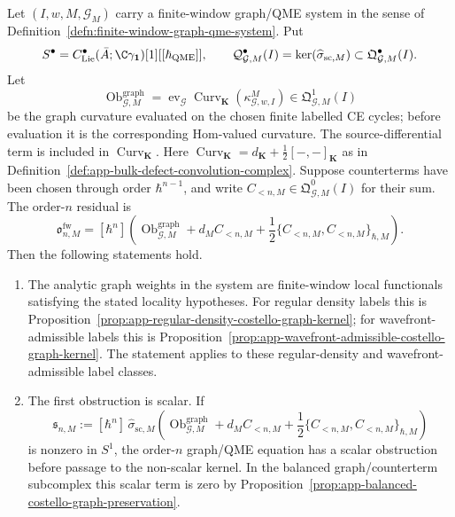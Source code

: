 \begin{thm}\label{thm:finite-window-graph-qme-assembly}
  Let
  \((I,w,M,\mathcal G_M)\) carry a finite-window graph/QME system in the
  sense of Definition~\ref{defn:finite-window-graph-qme-system}.  Put
  \[
    S^\bullet=
    C^\bullet_{\mathrm{Lie}}(\bar A;\C\gamma_{\mathbf 1})[1][[\hbar_{\mathrm{QME}}]],
    \qquad
    \mathcal Q^\bullet_{\mathcal G,M}(I)
      =
    \ker(\widehat\sigma_{\mathrm{sc},M})
      \subset \mathfrak Q^\bullet_{\mathcal G,M}(I).
  \]
  Let
  \[
    \operatorname{Ob}^{\mathrm{graph}}_{\mathcal G,M}
      =
    \operatorname{ev}_{\mathcal G}
    \operatorname{Curv}_{\mathbf K}(\kappa^M_{\mathcal G,w,I})
      \in \mathfrak Q^1_{\mathcal G,M}(I)
  \]
  be the graph curvature evaluated on the chosen finite labelled CE
  cycles; before evaluation it is the corresponding Hom-valued curvature.
  The source-differential term is included in
  \(\operatorname{Curv}_{\mathbf K}\).  Here
  \(\operatorname{Curv}_{\mathbf K}=d_{\mathbf K}
  +\frac12[-,-]_{\mathbf K}\) as in
  Definition~\ref{def:app-bulk-defect-convolution-complex}.  Suppose
  counterterms have been chosen through order \(\hbar^{n-1}\), and write
  \(C_{<n,M}\in\mathfrak Q^0_{\mathcal G,M}(I)\) for their sum.  The
  order-\(n\) residual is
  \[
    \mathfrak o^{\mathrm{fw}}_{n,M}
      =
    [\hbar^n]\left(
      \operatorname{Ob}^{\mathrm{graph}}_{\mathcal G,M}
      +d_M C_{<n,M}
      +\frac12\{C_{<n,M},C_{<n,M}\}_{\hbar,M}
    \right).
  \]
  Then the following statements hold.
  \begin{enumerate}[label=(\arabic*)]
    \item The analytic graph weights in the system are finite-window
    local functionals satisfying the stated locality hypotheses.  For
    regular density labels this is
    Proposition~\ref{prop:app-regular-density-costello-graph-kernel}; for
    wavefront-admissible labels this is
    Proposition~\ref{prop:app-wavefront-admissible-costello-graph-kernel}.
    The statement applies to these regular-density and
    wavefront-admissible label classes.

    \item The first obstruction is scalar.  If
    \[
      \mathfrak s_{n,M}:=
      [\hbar^n]\,
      \widehat\sigma_{\mathrm{sc},M}\!\left(
        \operatorname{Ob}^{\mathrm{graph}}_{\mathcal G,M}
        +d_M C_{<n,M}
        +\frac12\{C_{<n,M},C_{<n,M}\}_{\hbar,M}
      \right)
    \]
    is nonzero in \(S^1\), the order-\(n\) graph/QME equation has a
    scalar obstruction before passage to the non-scalar kernel.  In the balanced graph/counterterm
    subcomplex this scalar term is zero by
    Proposition~\ref{prop:app-balanced-costello-graph-preservation}.


\end{enumerate}
\end{thm}
